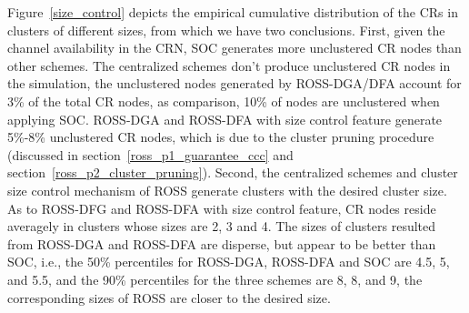 \documentclass[times]{ettauth}
\newcommand{\ie}{i.e., }
\theoremstyle{mytheoremstyle}
\theoremstyle{mytheoremstyle}
\theoremstyle{mytheoremstyle}
\begin{document}
Figure~\ref{size_control} depicts the empirical cumulative distribution of the CRs in clusters of different sizes, from which we have two conclusions.
First, given the channel availability in the CRN, SOC generates more unclustered CR nodes than other schemes.
The centralized schemes don't produce unclustered CR nodes in the simulation, the unclustered nodes generated by ROSS-DGA/DFA account for 3\% of the total CR nodes, as comparison, 10\% of nodes are unclustered when applying SOC.
ROSS-DGA and ROSS-DFA with size control feature generate 5\%-8\% unclustered CR nodes, which is due to the cluster pruning procedure (discussed in section~\ref{ross_p1_guarantee_ccc} and section~\ref{ross_p2_cluster_pruning}).
Second, the centralized schemes and cluster size control mechanism of ROSS generate clusters with the desired cluster size.
As to ROSS-DFG and ROSS-DFA with size control feature, CR nodes reside averagely in clusters whose sizes are 2, 3 and 4.
The sizes of clusters resulted from ROSS-DGA and ROSS-DFA are disperse, but appear to be better than SOC, i.e., the 50\% percentiles for ROSS-DGA, ROSS-DFA and SOC are 4.5, 5, and 5.5, and the 90\% percentiles for the three schemes are 8, 8, and 9, the corresponding sizes of ROSS are closer to the desired size.
\end{document}
